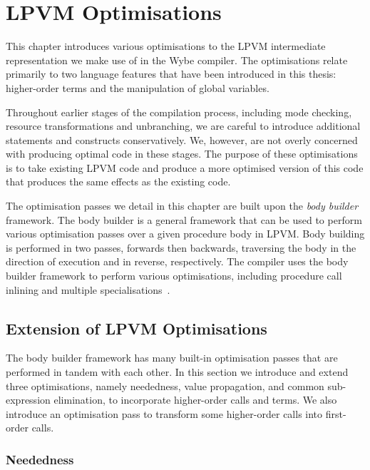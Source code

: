 \clearpage

\def\chaptertitle{LPVM Optimisations}

\lhead{\emph{\chaptertitle}}

\chapter{\chaptertitle}
\label{ch:lpvm-optimisations}

This chapter introduces various optimisations to the LPVM intermediate representation we make use of in the Wybe compiler. The optimisations relate primarily to two language features that have been introduced in this thesis: higher-order terms and the manipulation of global variables. 

Throughout earlier stages of the compilation process, including mode checking, resource transformations and unbranching, we are careful to introduce additional statements and constructs conservatively. We, however, are not overly concerned with producing optimal code in these stages. The purpose of these optimisations is to take existing LPVM code and produce a more optimised version of this code that produces the same effects as the existing code.

The optimisation passes we detail in this chapter are built upon the \textit{body builder} framework. The body builder is a general framework that can be used to perform various optimisation passes over a given procedure body in LPVM. Body building is performed in two passes, forwards then backwards, traversing the body in the direction of execution and in reverse, respectively. The compiler uses the body builder framework to perform various optimisations, including procedure call inlining and multiple specialisations~\cite{chen2020multiple}. 

\section{Extension of LPVM Optimisations}
\label{sec:higher-order-opt}

The body builder framework has many built-in optimisation passes that are performed in tandem with each other. In this section we introduce and extend three optimisations, namely neededness, value propagation, and common sub-expression elimination, to incorporate higher-order calls and terms. We also introduce an optimisation pass to transform some higher-order calls into first-order calls. 

\subsection{Neededness}
\label{ssec:neededness}

